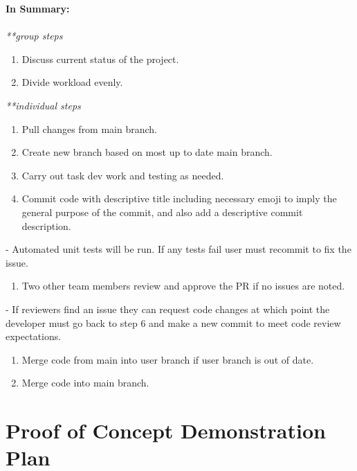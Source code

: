 \documentclass{article}
\begin{document}
\textbf{In Summary:}\\ \\
\textit{**group steps}
\begin{enumerate}[resume]
  \item Discuss current status of the project.
  \item Divide workload evenly.
  \end{enumerate}
\textit{**individual steps}
\begin{enumerate}[resume]
  \item Pull changes from main branch.
  \item Create new branch based on most up to date main branch.
  \item Carry out task dev work and testing as needed.
  \item Commit code with descriptive title including necessary emoji to imply the general purpose of the commit, and also add a descriptive commit description.
  \end{enumerate}
  \begin{adjustwidth}{1.3cm}{0cm}
  - Automated unit tests will be run. If any tests fail user must recommit to fix the issue.
  \end{adjustwidth}
\begin{enumerate}[resume]
  \item Two other team members review and approve the PR if no issues are noted.
  \end{enumerate}
  \begin{adjustwidth}{1.3cm}{0cm}
  - If reviewers find an issue they can request code changes at which point the developer must go back to step 6 and make a new commit to meet code review expectations.
  \end{adjustwidth}
\begin{enumerate}[resume]
  \item Merge code from main into user branch if user branch is out of date.
  \item Merge code into main branch.
\end{enumerate}

\section{Proof of Concept Demonstration Plan}
\end{document}
